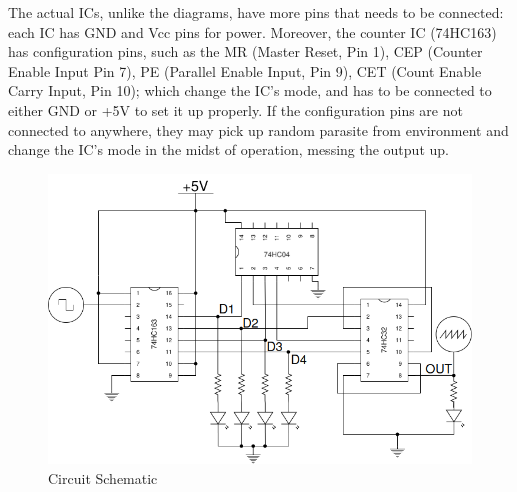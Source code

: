 \documentclass[a4paper, 12pt]{article}
\begin{document}
The actual ICs, unlike the diagrams, have more pins that needs to be connected:
each IC has GND and Vcc pins for power.
Moreover, the counter IC (74HC163) has configuration pins, such as the MR (Master Reset, Pin 1), CEP (Counter Enable Input Pin 7), PE (Parallel Enable Input, Pin 9), CET (Count Enable Carry Input, Pin 10); which change the IC's mode, and has to be connected to either GND or +5V to set it up properly.
If the configuration pins are not connected to anywhere, they may pick up random parasite from environment and change the IC's mode in the midst of operation, messing the output up.

\begin{figure}
	\centering
	\includegraphics[width=\textwidth]{sch.png}
	\caption{Circuit Schematic}
	\label{fig:sch}
\end{figure}
\end{document}
